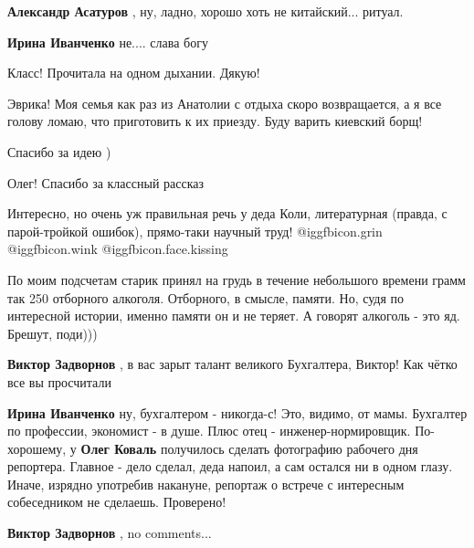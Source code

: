 \begin{itemize}
\begin{itemize}
\begin{itemize}
\textbf{Александр Асатуров} , ну, ладно, хорошо хоть не китайский... ритуал.

\textbf{Ирина Иванченко} не.... слава богу
\end{itemize} %

\end{itemize} %

Класс! Прочитала на одном дыхании. Дякую!


Эврика! Моя семья как раз из Анатолии с отдыха скоро возвращается, а я все
голову ломаю, что приготовить к их приезду. Буду варить киевский борщ!

Спасибо за идею )

Олег!
Спасибо за классный рассказ

Интересно, но очень уж правильная речь у деда Коли, литературная (правда, с парой-тройкой ошибок), прямо-таки научный труд!  @igg{fbicon.grin}  @igg{fbicon.wink}  @igg{fbicon.face.kissing} 


По моим подсчетам старик принял на грудь в течение небольшого времени грамм так
250 отборного алкоголя. Отборного, в смысле, памяти. Но, судя по интересной
истории, именно памяти он и не теряет. А говорят алкоголь - это яд. Брешут,
поди)))

\begin{itemize} %
\textbf{Виктор Задворнов} , в вас зарыт талант великого Бухгалтера, Виктор! Как чётко все вы просчитали

\begin{itemize} %
\textbf{Ирина Иванченко} ну, бухгалтером - никогда-с! Это, видимо, от мамы. Бухгалтер по профессии, экономист - в душе. Плюс отец - инженер-нормировщик. По-хорошему, у \textbf{Олег Коваль} получилось сделать фотографию рабочего дня репортера. Главное - дело сделал, деда напоил, а сам остался ни в одном глазу. Иначе, изрядно употребив накануне, репортаж о встрече с интересным собеседником не сделаешь. Проверено!

\textbf{Виктор Задворнов} , no comments...
\end{itemize} %

\end{itemize} %



\end{itemize}
